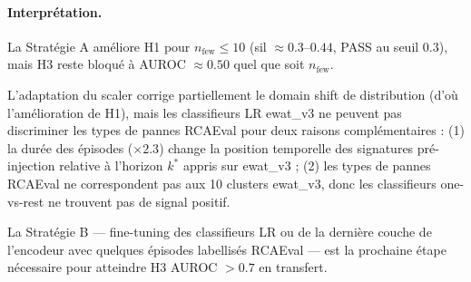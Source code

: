 \paragraph{Interprétation.}
La Stratégie A améliore H1 pour $n_\text{few} \leq 10$ (sil $\approx 0.3$--$0.44$,
PASS au seuil $0.3$), mais H3 reste bloqué à AUROC $\approx 0.50$ quel que soit
$n_\text{few}$.

L'adaptation du scaler corrige partiellement le domain shift de distribution
(d'où l'amélioration de H1), mais les classifieurs LR ewat\_v3 ne peuvent pas
discriminer les types de pannes RCAEval pour deux raisons complémentaires :
(1) la durée des épisodes ($\times 2.3$) change la position temporelle des signatures
pré-injection relative à l'horizon $k^*$ appris sur ewat\_v3 ;
(2) les types de pannes RCAEval ne correspondent pas aux 10 clusters ewat\_v3,
donc les classifieurs one-vs-rest ne trouvent pas de signal positif.

La Stratégie B --- fine-tuning des classifieurs LR ou de la dernière couche de
l'encodeur avec quelques épisodes labellisés RCAEval --- est la prochaine étape
nécessaire pour atteindre H3 AUROC $> 0.7$ en transfert.
